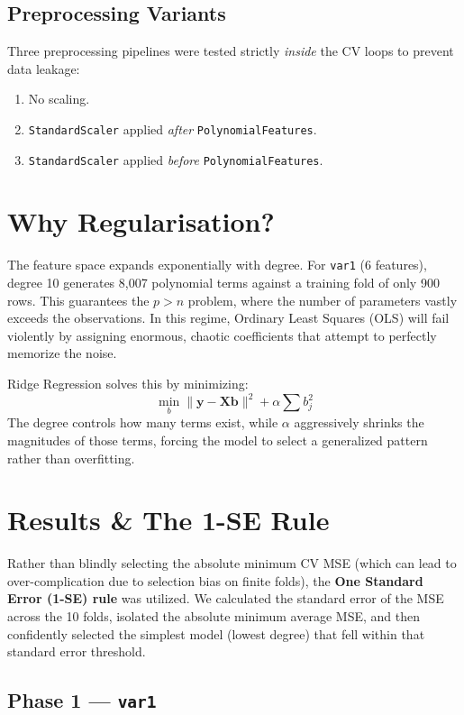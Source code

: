 \documentclass[12pt,a4paper]{article}
\begin{document}
\subsection{Preprocessing Variants}
Three preprocessing pipelines were tested strictly \textit{inside} the CV loops to prevent data leakage:
\begin{enumerate}
    \item[A.] No scaling.
    \item[B.] \texttt{StandardScaler} applied \textit{after} \texttt{PolynomialFeatures}.
    \item[C.] \texttt{StandardScaler} applied \textit{before} \texttt{PolynomialFeatures}.
\end{enumerate}

\section{Why Regularisation?}
The feature space expands exponentially with degree. For \texttt{var1} (6 features), degree 10 generates 8,007 polynomial terms against a training fold of only 900 rows. This guarantees the $p > n$ problem, where the number of parameters vastly exceeds the observations. In this regime, Ordinary Least Squares (OLS) will fail violently by assigning enormous, chaotic coefficients that attempt to perfectly memorize the noise. 

Ridge Regression solves this by minimizing:
\[ \min_b \|\mathbf{y} - \mathbf{Xb}\|^2 + \alpha \sum b_j^2 \]
The degree controls how many terms exist, while $\alpha$ aggressively shrinks the magnitudes of those terms, forcing the model to select a generalized pattern rather than overfitting.

\section{Results \& The 1-SE Rule}

Rather than blindly selecting the absolute minimum CV MSE (which can lead to over-complication due to selection bias on finite folds), the \textbf{One Standard Error (1-SE) rule} was utilized. We calculated the standard error of the MSE across the 10 folds, isolated the absolute minimum average MSE, and then confidently selected the simplest model (lowest degree) that fell within that standard error threshold.

\subsection{Phase 1 — \texttt{var1}}
\end{document}
